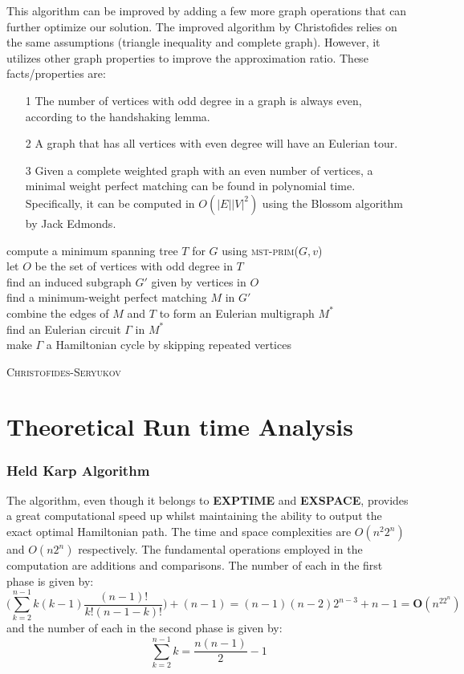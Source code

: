 \documentclass[12pt]{report}
\begin{document}
  This algorithm can be improved by adding a few more graph operations that can further optimize our solution.
  The improved algorithm by Christofides relies on the same assumptions (triangle inequality and complete graph). 
  However, it utilizes other graph properties to improve the approximation ratio. These facts/properties are:
  \begin{enumerate}
    \item[1] The number of vertices with odd degree in a graph is always even, according to the handshaking lemma. 
    \item[2] A graph that has all vertices with even degree will have an Eulerian tour. 
    \item[3] Given a complete weighted graph with an even number of vertices, a minimal weight perfect matching can be found in polynomial 
     time. Specifically, it can be computed in $O(|E||V|^2)$  using the Blossom algorithm by Jack Edmonds.
  \end{enumerate} 
  
  
  \begin{algorithm*}
  
    compute a minimum spanning tree $T$ for $G$ using \textsc{mst-prim}($G, v$) \\
    let $O$ be the set of vertices with odd degree in $T$ \\
    find an induced subgraph $G'$ given by vertices in $O$ \\
    find a minimum-weight perfect matching $M$ in $G'$ \\
    combine the edges of $M$ and $T$ to form an Eulerian multigraph $M^*$ \\
    find an Eulerian circuit $\Gamma$ in $M^*$ \\
    make $\Gamma$ a Hamiltonian cycle by skipping repeated vertices \\
    \caption{\textsc{Christofides-Seryukov}}
\end{algorithm*}

\newpage
\chapter{Theoretical Run time Analysis}
\subsection{Held Karp Algorithm}
The algorithm, even though it belongs to \textbf{EXPTIME} and \textbf{EXSPACE}, provides a great computational speed up whilst maintaining the ability to output the exact optimal Hamiltonian path. The time and space complexities are $O(n^2 2^n)$ and $O(n2^n)$ respectively. The fundamental operations employed in the computation are additions and comparisons. The number of each in the first phase is given by: 
$$\bigg( \sum_{k = 2}^{n-1}k(k-1) \frac{(n-1)!}{k!(n-1-k)!}\bigg) + (n-1) = (n-1)(n-2)2^{n-3} + n-1 = \mathbf{O}(n^22^n)$$
and the number of each in the second phase is given by: 
$$\sum_{k=2}^{n-1}k = \frac{n(n-1)}{2} - 1$$
\end{document}

